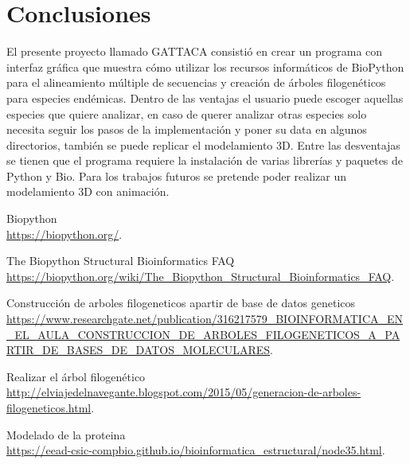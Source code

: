 \documentclass[a4paper]{article}
\begin{document}
\section{Conclusiones}

El presente proyecto llamado GATTACA consistió en crear un programa con interfaz gráfica que muestra cómo utilizar los recursos informáticos de BioPython para el alineamiento múltiple de secuencias y creación de árboles filogenéticos para especies endémicas. Dentro de las ventajas el usuario puede escoger aquellas especies que quiere analizar, en caso de querer analizar otras especies solo necesita seguir los pasos de la implementación y poner su data en algunos directorios, también se puede replicar el modelamiento 3D. Entre las desventajas se tienen que el programa requiere la instalación de varias librerías y paquetes de Python y Bio. Para los trabajos futuros se pretende poder realizar un modelamiento 3D con animación.

\begin{thebibliography}{0}
	
	\bibitem{} Biopython\\ \textcolor{blue}{\url{https://biopython.org/}}.
	
	\bibitem{}The Biopython Structural Bioinformatics FAQ\\
	\textcolor{blue}{\url{https://biopython.org/wiki/The_Biopython_Structural_Bioinformatics_FAQ}}.
	
	\bibitem{}Construcción de arboles filogeneticos apartir de base de datos geneticos\\ \textcolor{blue}{\url{https://www.researchgate.net/publication/316217579_BIOINFORMATICA_EN_EL_AULA_CONSTRUCCION_DE_ARBOLES_FILOGENETICOS_A_PARTIR_DE_BASES_DE_DATOS_MOLECULARES}}.
	
	\bibitem{}Realizar el árbol filogenético\\ \textcolor{blue}{\url{http://elviajedelnavegante.blogspot.com/2015/05/generacion-de-arboles-filogeneticos.html}}.
	
	\bibitem{} Modelado de la proteina\\ \textcolor{blue}{\url{https://eead-csic-compbio.github.io/bioinformatica_estructural/node35.html}}.
	
	
	
	
\end{thebibliography}
\end{document}
